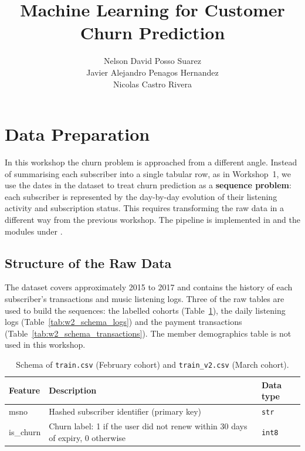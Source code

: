 \documentclass{article}
\title{Machine Learning for Customer Churn Prediction}
\author{Nelson David Posso Suarez \\ Javier Alejandro Penagos Hernandez \\ Nicolas Castro Rivera }
\date{}
\begin{document}
\maketitle

\section{Data Preparation}

In this workshop the churn problem is approached from a different angle. Instead of summarising each subscriber into a single tabular row, as in Workshop~1, we use the dates in the dataset to treat churn prediction as a \textbf{sequence problem}: each subscriber is represented by the day-by-day evolution of their listening activity and subscription status. This requires transforming the raw data in a different way from the previous workshop. The pipeline is implemented in  and the modules under .

\subsection{Structure of the Raw Data}

The dataset covers approximately 2015 to 2017 and contains the history of each subscriber's transactions and music listening logs. Three of the raw tables are used to build the sequences: the labelled cohorts (Table~\ref{tab:w2_schema_train}), the daily listening logs (Table~\ref{tab:w2_schema_logs}) and the payment transactions (Table~\ref{tab:w2_schema_transactions}). The member demographics table is not used in this workshop.

\begin{table}[H]
\centering
\renewcommand{\arraystretch}{1.3}
\begin{tabularx}{\textwidth}{|l|X|l|}
\hline
\textbf{Feature} & \textbf{Description} & \textbf{Data type} \\ \hline
msno      & Hashed subscriber identifier (primary key) & \texttt{str} \\ \hline
is\_churn & Churn label: 1 if the user did not renew within 30 days of expiry, 0 otherwise & \texttt{int8} \\ \hline
\end{tabularx}
\caption{Schema of \texttt{train.csv} (February cohort) and \texttt{train\_v2.csv} (March cohort).}
\label{tab:w2_schema_train}
\end{table}
\end{document}
